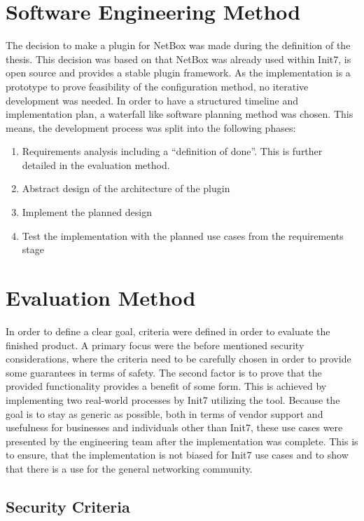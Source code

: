 \section{\label{method-soft}Software Engineering Method}

The decision to make a plugin for NetBox was made during the definition
of the thesis. This decision was based on that NetBox was already used
within Init7, is open source and provides a stable plugin framework.
As the implementation is a prototype to prove feasibility of the
configuration method, no iterative development was needed.
In order to have a structured timeline and implementation plan,
a waterfall like software planning method was chosen.
This means, the development process was split into the following phases:

\begin{enumerate}
  \item Requirements analysis including a ``definition of done''. This is further detailed
        in the evaluation method.
  \item Abstract design of the architecture of the plugin
  \item Implement the planned design
  \item Test the implementation with the planned use cases from the requirements stage
\end{enumerate}

\section{Evaluation Method}

In order to define a clear goal, criteria were defined in order to evaluate
the finished product.
A primary focus were the before mentioned security considerations,
where the criteria need to be carefully chosen in order to provide
some guarantees in terms of safety. The second factor is to prove
that the provided functionality provides a benefit of some form.
This is achieved by implementing two real-world processes by Init7
utilizing the tool. Because the goal is to stay as generic as possible,
both in terms of vendor support and usefulness for businesses and individuals
other than Init7, these use cases were presented by the engineering team
after the implementation was complete. This is to ensure, that the implementation
is not biased for Init7 use cases and to show that there is a use for
the general networking community.

\subsection{\label{method:eval-sec}Security Criteria}

